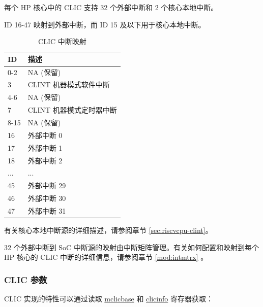 \documentclass[main\_\_CN.tex]{subfiles}
\begin{document}
每个 HP 核心中的 CLIC 支持 32 个外部中断和 2 个核心本地中断。

ID 16-47 映射到外部中断，而 ID 15 及以下用于核心本地中断。

\begin{longtable}{ | l | l | }
\caption{CLIC 中断映射}
\label{tab:riscvcpu-clic-intmap-table}
\\ \hline
\rowcolor{lightgray}
ID & 描述 \\ \hline
0-2 & NA (保留) \\ \hline
3 & CLINT 机器模式软件中断 \\ \hline
4-6 & NA (保留) \\ \hline
7 & CLINT 机器模式定时器中断 \\ \hline
8-15 & NA (保留) \\ \hline
16 & 外部中断 0 \\ \hline
17 & 外部中断 1 \\ \hline
18 & 外部中断 2 \\ \hline
... & ... \\ \hline
45 & 外部中断 29 \\ \hline
46 & 外部中断 30 \\ \hline
47 & 外部中断 31 \\ \hline
\end{longtable}

有关核心本地中断源的详细描述，请参阅章节 \ref{sec:riscvcpu-clint}。

32 个外部中断到 SoC 中断源的映射由中断矩阵管理。有关如何配置和映射到每个 HP 核心的 CLIC 中断的详细信息，请参阅章节 \ref{mod:intmtrx} \textit{}。

\hypertarget{riscvcpu-clic-params}{}
\subsubsection{CLIC 参数}
\label{sec:riscvcpu-clic-params}

CLIC 实现的特性可以通过读取 \hyperref[regdesc:MCLICBASE_REG]{mclicbase} 和 \hyperref[regdesc:CLICINFO_REG]{clicinfo} 寄存器获取：
\end{document}
